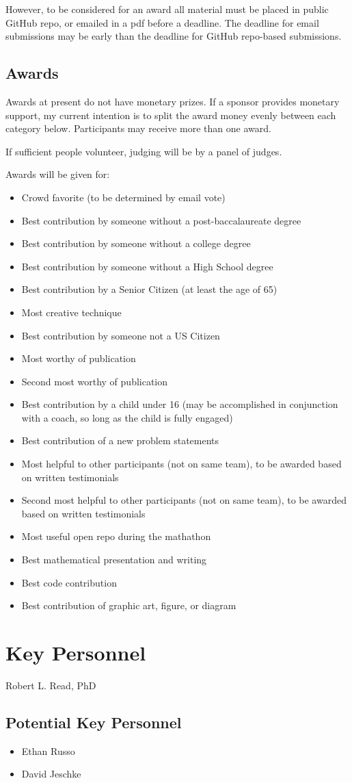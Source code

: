 \documentclass[11pt]{article}
\begin{document}
However, to be considered for an
award all material must be placed in public GitHub repo, or emailed in a pdf before a deadline.
The deadline for email submissions may be early than the deadline for GitHub repo-based submissions.

\subsection{Awards}

Awards at present do not have monetary prizes. If a sponsor provides monetary support, my current intention is to split
the award money evenly between each category below. Participants may receive more than one award.

If sufficient people volunteer, judging will be by a panel of judges.

Awards will be given for:
\begin{itemize}
\item Crowd favorite (to be determined by email vote)
\item Best contribution by someone without a post-baccalaureate degree
\item Best contribution by someone without a college degree
\item Best contribution by someone without a High School degree
\item Best contribution by a Senior Citizen (at least the age of 65)
\item Most creative technique
\item Best contribution by someone not a US Citizen
\item Most worthy of publication
\item Second most worthy of publication
\item Best contribution by a child under 16 (may be accomplished in conjunction with a coach, so long as the child is fully engaged)
\item Best contribution of a new problem statements
\item Most helpful to other participants (not on same team), to be awarded based on written testimonials
\item Second most helpful to other participants (not on same team), to be awarded based on written testimonials
\item Most useful open repo during the mathathon
\item Best mathematical presentation and writing
\item Best code contribution
\item Best contribution of graphic art, figure, or diagram
\end{itemize}

\section{Key Personnel}

Robert L. Read, PhD

\subsection{Potential Key Personnel}

\begin{itemize}
\item Ethan Russo
\item David Jeschke
\end{itemize}




\end{document}

